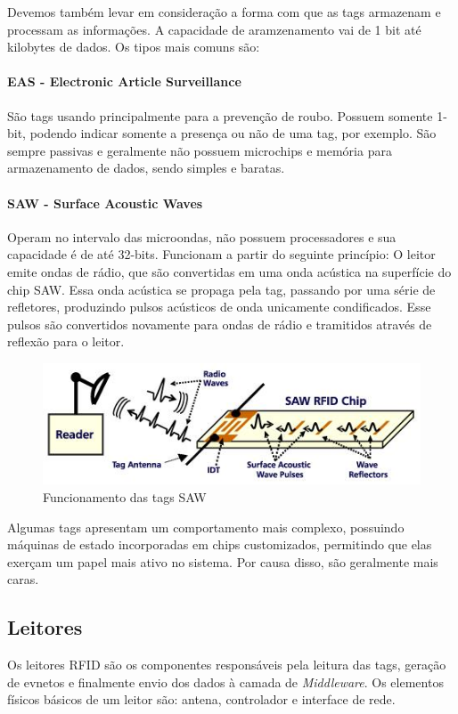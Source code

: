 \documentclass[a4paper,12pt,titlepage]{article}
\begin{document}
	Devemos também levar em consideração a forma com que as tags armazenam e processam as informações. A capacidade de aramzenamento vai de 1 bit até kilobytes de dados. Os tipos mais comuns são:
	
	\paragraph{EAS - Electronic Article Surveillance} São tags usando principalmente para a prevenção de roubo. Possuem somente 1-bit, podendo indicar somente a presença ou não de uma tag, por exemplo. São sempre passivas e geralmente não possuem microchips e memória para armazenamento de dados, sendo simples e baratas. 
	
	\paragraph{SAW - Surface Acoustic Waves} Operam no intervalo das microondas, não possuem processadores e sua capacidade é de até 32-bits. Funcionam a partir do seguinte princípio: O leitor emite ondas de rádio, que são convertidas em uma onda acústica na superfície do chip SAW. Essa onda acústica se propaga pela tag, passando por uma série de refletores, produzindo pulsos acústicos de onda unicamente condificados. Esse pulsos são convertidos novamente  para ondas de rádio e tramitidos através de reflexão para o leitor.
	
		\begin{figure}[h!]
			\centering
			\includegraphics[width=0.5\linewidth]{sawrfid_chip}
			\caption{Funcionamento das tags SAW}
			\label{fig:sawtag}
		\end{figure}
		
	Algumas tags apresentam um comportamento mais complexo, possuindo máquinas de estado incorporadas em chips customizados, permitindo que elas exerçam um papel mais ativo no sistema. Por causa disso, são geralmente mais caras. 
	
	\subsection{Leitores}
	Os leitores RFID são os componentes responsáveis pela leitura das tags, geração de evnetos e finalmente envio dos dados à camada de \textit{Middleware}. Os elementos físicos básicos de um leitor são: antena, controlador e interface de rede.
	
\end{document}
